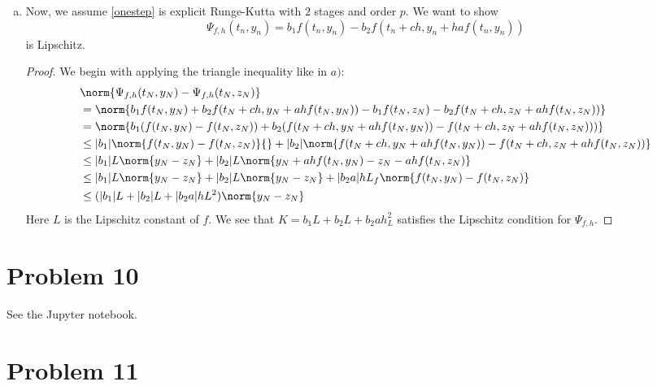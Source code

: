 \begin{enumerate}[a)]
  \item
Now, we assume \ref{onestep} is explicit Runge-Kutta with $2$ stages and order $p$. We want to show
 \begin{equation}
   \Psi_{f, h}\left(t_{n}, y_{n}\right)=b_{1} f\left(t_{n}, y_{n}\right)-b_{2} f\left(t_{n}+c h, y_{n}+h a f\left(t_{n}, y_{n}\right)\right)
 \end{equation}
is Lipschitz.
\begin{proof}
  We begin with applying the triangle inequality like in $a)$:
    \begin{align*}
      & \norm{\Psi_{f,h}(t_N, y_N)- \Psi_{f,h}(t_N, z_N)} \\
      & = \norm{
      b_1f(t_N, y_N)+b_2f(t_N + ch, y_N + ahf(t_N, y_N))-b_1f(t_N, z_N)-b_2f(t_N+ch, z_N+ahf(t_N, z_N))
      } \\
      & =\norm{
      b_1(f(t_N, y_N)-f(t_N, z_N)) + b_2(f(t_N + ch, y_N + ahf(t_N, y_N))-f(t_N + ch, z_N + ahf(t_N, z_N)))
      } \\
      & \leq |b_1|\norm{f(t_N, y_N)-f(t_N, z_N)}{} + |b_2|\norm{f(t_N +ch, y_N + ahf(t_N, y_N))-f(t_N + ch, z_N + ahf(t_N, z_N))} \\
      & \leq  |b_1|L\norm{y_N-z_N} + |b_2|L\norm{y_N + ahf(t_N, y_N) - z_N -ahf(t_N, z_N)}\\
      & \leq |b_1|L\norm{y_N-z_N}+|b_2|L\norm{y_N-z_N}+|b_2a|hL_f\norm{f(t_N, y_N)-f(t_N, z_N)} \\
      & \leq (|b_1|L+|b_2|L+|b_2a|hL^2)\norm{y_N-z_N}
    \end{align*}
Here $L$ is the Lipschitz constant of $f$. We see that $K = b_1L+b_2L+b_2ah_L^2$ satisfies the Lipschitz condition for $\Psi_{f,h}$.
\end{proof}

\end{enumerate}

\section{Problem 10}

See the Jupyter notebook.

\section{Problem 11}


